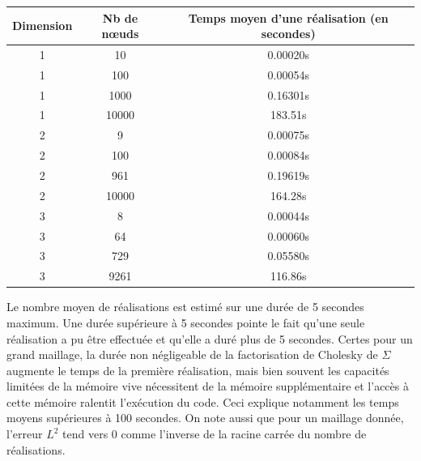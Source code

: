 \normalsize{
\begin{table}[htbp]
\footnotesize{
\begin{tabular}{|c |c |c |}
\hline
Dimension & Nb de n\oe uds & Temps moyen d'une réalisation (en secondes) \\
\hline
1 & 10 & 0.00020s    \\
\hline
1 & 100 & 0.00054s  \\
\hline
1 & 1000 & 0.16301s   \\
\hline
1 & 10000 & 183.51s    \\
\hline
\hline
2 & 9 & 0.00075s    \\
\hline
2 & 100 & 0.00084s    \\
\hline
2 & 961 & 0.19619s  \\
\hline
2 & 10000 & 164.28s   \\
\hline
\hline
3 & 8 & 0.00044s    \\
\hline
3 & 64 & 0.00060s    \\
\hline
3 & 729 & 0.05580s    \\
\hline
3 & 9261 & 116.86s  \\
\hline
\end{tabular}
}
\end{table}
\newpage
\small{
\begin{remark}
Le nombre moyen de réalisations est estimé sur une durée de 5 secondes maximum.
Une durée supérieure à 5 secondes pointe le fait qu'une
seule réalisation a pu être effectuée et qu'elle a duré plus de 5 secondes.
Certes pour un grand maillage, la durée non négligeable de la factorisation de
Cholesky de $\Sigma$ augmente le temps de la première réalisation, mais bien souvent
les capacités limitées de la mémoire vive nécessitent de la
mémoire supplémentaire et l'accès à cette mémoire ralentit l'exécution
du code. Ceci explique notamment les temps moyens supérieures à 100 secondes. On note aussi
que pour un maillage donnée, l'erreur $L^2$ tend vers $0$ comme l'inverse de
la racine carrée du nombre de réalisations.\\
~\\
\end{remark}
}
\normalsize{}

}
